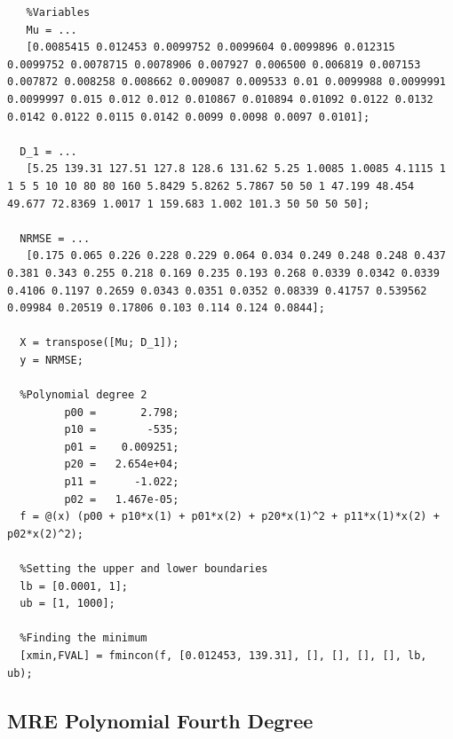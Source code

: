 \lstset{style=matlab} %
\begin{lstlisting}
   %Variables
   Mu = ...
   [0.0085415 0.012453 0.0099752 0.0099604 0.0099896 0.012315 0.0099752 0.0078715 0.0078906 0.007927 0.006500 0.006819 0.007153 0.007872 0.008258 0.008662 0.009087 0.009533 0.01 0.0099988 0.0099991 0.0099997 0.015 0.012 0.012 0.010867 0.010894 0.01092 0.0122 0.0132 0.0142 0.0122 0.0115 0.0142 0.0099 0.0098 0.0097 0.0101];
  
  D_1 = ...
   [5.25 139.31 127.51 127.8 128.6 131.62 5.25 1.0085 1.0085 4.1115 1 1 5 5 10 10 80 80 160 5.8429 5.8262 5.7867 50 50 1 47.199 48.454 49.677 72.8369 1.0017 1 159.683 1.002 101.3 50 50 50 50];
  
  NRMSE = ...
   [0.175 0.065 0.226 0.228 0.229 0.064 0.034 0.249 0.248 0.248 0.437 0.381 0.343 0.255 0.218 0.169 0.235 0.193 0.268 0.0339 0.0342 0.0339 0.4106 0.1197 0.2659 0.0343 0.0351 0.0352 0.08339 0.41757 0.539562 0.09984 0.20519 0.17806 0.103 0.114 0.124 0.0844];
  
  X = transpose([Mu; D_1]);
  y = NRMSE;
  
  %Polynomial degree 2
         p00 =       2.798;
         p10 =        -535;
         p01 =    0.009251;
         p20 =   2.654e+04;
         p11 =      -1.022;
         p02 =   1.467e-05;
  f = @(x) (p00 + p10*x(1) + p01*x(2) + p20*x(1)^2 + p11*x(1)*x(2) + p02*x(2)^2);
  
  %Setting the upper and lower boundaries
  lb = [0.0001, 1];
  ub = [1, 1000];

  %Finding the minimum
  [xmin,FVAL] = fmincon(f, [0.012453, 139.31], [], [], [], [], lb, ub);
\end{lstlisting}

\subsection*{MRE Polynomial Fourth Degree}

\lstset{style=matlab} %

